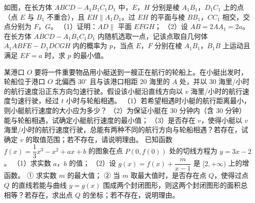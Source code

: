 \begingroup
\renewenvironment{question}{\Needspace{0.5\textheight}}{}
\begin{question}
如图，在长方体 $ABCD-A_1B_1C_1D_1$ 中，$E$，$H$ 分别是棱 $A_1B_1$，$D_1C_1$ 上的点（点 $E$ 与 $B_1$ 不重合），且 $EH\parallel A_1D_1$。过 $EH$ 的平面与棱 $BB_1$，$CC_1$ 相交，交点分别为 $F$，$G$。
（1）证明：$AD\parallel$ 平面 $EFGH$；
（2）设 $AB=2AA_1=2a$。在长方体 $ABCD-A_1B_1C_1D_1$ 内随机选取一点，记该点取自几何体 $A_1ABFE-D_1DCGH$ 内的概率为 $p$，当点 $E$，$F$ 分别在棱 $A_1B_1$，$B_1B$ 上运动且满足 $EF=a$ 时，求 $p$ 的最小值。
\nopagebreak[4]
\begin{center}\end{center}
\nopagebreak[4]
\end{question}
\endgroup
\begin{question}
某港口 $O$ 要将一件重要物品用小艇送到一艘正在航行的轮船上。在小艇出发时，轮船位于港口 $O$ 北偏西 $30^\circ$ 且与该港口相距 $20$ 海里的 $A$ 处，并以 $30$ 海里/小时的航行速度沿正东方向匀速行驶。假设该小艇沿直线方向以 $v$ 海里/小时的航行速度匀速行驶，经过 $t$ 小时与轮船相遇。
（1）若希望相遇时小艇的航行距离最小，则小艇航行速度的大小应为多少？
（2）为保证小艇在 $30$ 分钟内（含 $30$ 分钟）能与轮船相遇，试确定小艇航行速度的最小值；
（3）是否存在 $v$，使得小艇以 $v$ 海里/小时的航行速度行驶，总能有两种不同的航行方向与轮船相遇？若存在，试确定 $v$ 的取值范围；若不存在，请说明理由。
\end{question}
\begin{question}
已知函数 $f(x)=\dfrac13x^3-x^2+ax+b$ 的图象在点 $P(0,f(0))$ 处的切线方程为 $y=3x-2$。
（1）求实数 $a$，$b$ 的值；
（2）设 $g(x)=f(x)+\dfrac{m}{x-1}$ 是 $[2,+\infty)$ 上的增函数。
① 求实数 $m$ 的最大值；
② 当 $m$ 取最大值时，是否存在点 $Q$，使得过点 $Q$ 的直线若能与曲线 $y=g(x)$ 围成两个封闭图形，则这两个封闭图形的面积总相等？若存在，求出点 $Q$ 的坐标；若不存在，说明理由。

\end{question}